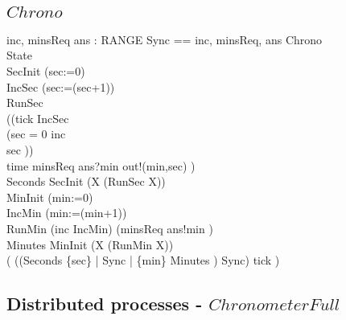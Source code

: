 \subsection{$Chrono$}
\begin{circus}
\circchannel inc, minsReq
\also \circchannel ans : RANGE
\also \circchannelset Sync == \lchanset inc, minsReq, ans \rchanset
\also \circprocess Chrono \circdef\ \circbegin\\
\circstate State \\
 SecInit \circdef (sec:=0)\\
 IncSec \circdef (sec:=(sec+1))\\
 RunSec \circdef\\
  ((tick \then IncSec \circseq\\
      (\circif  sec = 0 \circthen inc \then \Skip\\
      \circelse sec  \circthen \Skip \circfi))\\
      \extchoice time \then minsReq \then ans?min \then out!(min,sec) \then \Skip )  \\
 Seconds \circdef SecInit \circseq (\circmu X \circspot (RunSec \circseq X))\\

 MinInit \circdef (min:=0)\\
 IncMin \circdef (min:=(min+1))\\
 RunMin \circdef (inc \then IncMin) \extchoice (minsReq \then ans!min \then \Skip)\\
 Minutes \circdef MinInit \circseq (\circmu X \circspot (RunMin \circseq X))\\

\circspot( ((Seconds \lpar \{sec\} | Sync | \{min\} \rpar Minutes ) \circhide Sync) \circhide \lchanset tick \rchanset)\\
\circend
\end{circus}


\subsection{Distributed processes - $ChronometerFull$}
